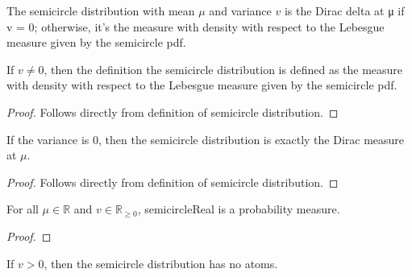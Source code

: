 

\begin{definition}
    \label{def:semicircle_distribution}
    \leanok
    The semicircle distribution with mean $\mu$ and variance $v$ is the Dirac delta at μ if v = 0; otherwise, it's the measure with density with respect to the Lebesgue measure given by the semicircle pdf.
\end{definition}

\begin{lemma}
    \label{lemma:semicircleReal_of_var_ne_zero}
    \leanok
    If $v \neq 0$, then the definition the semicircle distribution is defined as the measure with density with respect to the Lebesgue measure given by the semicircle pdf.
\end{lemma}

\begin{proof}
    \leanok
    Follows directly from definition of semicircle distribution.
\end{proof}

\begin{lemma}
    \label{lemma:semicircleReal_zero_var}
    \leanok
    If the variance is 0, then the semicircle distribution is exactly the Dirac measure at $\mu$.
\end{lemma}

\begin{proof}
    \leanok
    Follows directly from definition of semicircle distribution.
\end{proof}

\begin{lemma} %
    \label{lemma:instIsProbabilityMeasuresemicircleReal}
    \leanok

    For all $\mu \in \mathbb{R}$ and $v \in \mathbb{R}_{\ge 0}$, semicircleReal is a probability measure.
\end{lemma}

\begin{proof}
  \leanok
\end{proof}

\begin{lemma}
    \label{lemma:noAtoms_semicircleReal}
    \leanok
    If $v > 0$, then the semicircle distribution has no atoms.
\end{lemma}


